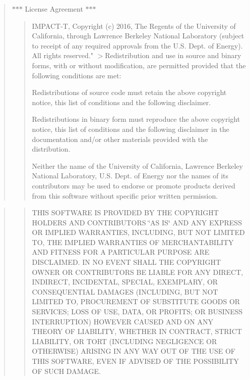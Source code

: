 \begin{quote}
$\ast$$\ast$$\ast$ License Agreement $\ast$$\ast$$\ast$ \begin{quote}
I\+M\+P\+A\+C\+T-\/T, Copyright (c) 2016, The Regents of the University of California, through Lawrence Berkeley National Laboratory (subject to receipt of any required approvals from the U.\+S. Dept. of Energy). All rights reserved." $>$Redistribution and use in source and binary forms, with or without modification, are permitted provided that the following conditions are met\+:
\begin{DoxyEnumerate}
\item Redistributions of source code must retain the above copyright notice, this list of conditions and the following disclaimer.
\item Redistributions in binary form must reproduce the above copyright notice, this list of conditions and the following disclaimer in the documentation and/or other materials provided with the distribution.
\item Neither the name of the University of California, Lawrence Berkeley National Laboratory, U.\+S. Dept. of Energy nor the names of its contributors may be used to endorse or promote products derived from this software without specific prior written permission. 
\end{DoxyEnumerate}\end{quote}
\end{quote}


\begin{quote}
\begin{quote}
T\+H\+IS S\+O\+F\+T\+W\+A\+RE IS P\+R\+O\+V\+I\+D\+ED BY T\+HE C\+O\+P\+Y\+R\+I\+G\+HT H\+O\+L\+D\+E\+RS A\+ND C\+O\+N\+T\+R\+I\+B\+U\+T\+O\+RS \char`\"{}\+A\+S I\+S\char`\"{} A\+ND A\+NY E\+X\+P\+R\+E\+SS OR I\+M\+P\+L\+I\+ED W\+A\+R\+R\+A\+N\+T\+I\+ES, I\+N\+C\+L\+U\+D\+I\+NG, B\+UT N\+OT L\+I\+M\+I\+T\+ED TO, T\+HE I\+M\+P\+L\+I\+ED W\+A\+R\+R\+A\+N\+T\+I\+ES OF M\+E\+R\+C\+H\+A\+N\+T\+A\+B\+I\+L\+I\+TY A\+ND F\+I\+T\+N\+E\+SS F\+OR A P\+A\+R\+T\+I\+C\+U\+L\+AR P\+U\+R\+P\+O\+SE A\+RE D\+I\+S\+C\+L\+A\+I\+M\+ED. IN NO E\+V\+E\+NT S\+H\+A\+LL T\+HE C\+O\+P\+Y\+R\+I\+G\+HT O\+W\+N\+ER OR C\+O\+N\+T\+R\+I\+B\+U\+T\+O\+RS BE L\+I\+A\+B\+LE F\+OR A\+NY D\+I\+R\+E\+CT, I\+N\+D\+I\+R\+E\+CT, I\+N\+C\+I\+D\+E\+N\+T\+AL, S\+P\+E\+C\+I\+AL, E\+X\+E\+M\+P\+L\+A\+RY, OR C\+O\+N\+S\+E\+Q\+U\+E\+N\+T\+I\+AL D\+A\+M\+A\+G\+ES (I\+N\+C\+L\+U\+D\+I\+NG, B\+UT N\+OT L\+I\+M\+I\+T\+ED TO, P\+R\+O\+C\+U\+R\+E\+M\+E\+NT OF S\+U\+B\+S\+T\+I\+T\+U\+TE G\+O\+O\+DS OR S\+E\+R\+V\+I\+C\+ES; L\+O\+SS OF U\+SE, D\+A\+TA, OR P\+R\+O\+F\+I\+TS; OR B\+U\+S\+I\+N\+E\+SS I\+N\+T\+E\+R\+R\+U\+P\+T\+I\+ON) H\+O\+W\+E\+V\+ER C\+A\+U\+S\+ED A\+ND ON A\+NY T\+H\+E\+O\+RY OF L\+I\+A\+B\+I\+L\+I\+TY, W\+H\+E\+T\+H\+ER IN C\+O\+N\+T\+R\+A\+CT, S\+T\+R\+I\+CT L\+I\+A\+B\+I\+L\+I\+TY, OR T\+O\+RT (I\+N\+C\+L\+U\+D\+I\+NG N\+E\+G\+L\+I\+G\+E\+N\+CE OR O\+T\+H\+E\+R\+W\+I\+SE) A\+R\+I\+S\+I\+NG IN A\+NY W\+AY O\+UT OF T\+HE U\+SE OF T\+H\+IS S\+O\+F\+T\+W\+A\+RE, E\+V\+EN IF A\+D\+V\+I\+S\+ED OF T\+HE P\+O\+S\+S\+I\+B\+I\+L\+I\+TY OF S\+U\+CH D\+A\+M\+A\+GE. \end{quote}
\end{quote}



